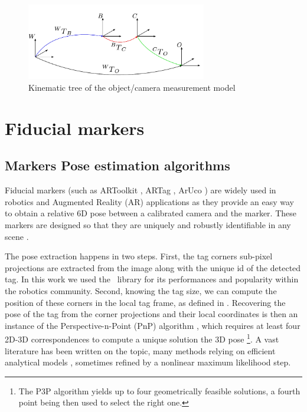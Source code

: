 \begin{figure}
    \centering
    \includegraphics[width=0.7\textwidth]{figures/kin_tree_object.pdf}
    \caption{Kinematic tree of the object/camera measurement model}
    \label{fig:camera_object_chain}
\end{figure}

%
%
\section{Fiducial markers}
\label{sec:fiducial_markers}
\subsection{Markers Pose estimation algorithms}

Fiducial markers (such as ARToolkit \cite{kato1999marker}, ARTag \cite{fiala2005artag}, ArUco \cite{garrido2014automatic}) are widely used in robotics 
and Augmented Reality (AR) applications as they provide an easy way to obtain a relative 6D pose 
between a calibrated camera and the marker. These markers are designed so that they are uniquely and robustly identifiable in any scene 
\cite{wang2016iros,romero2018speeded}. 

The pose extraction happens in two steps. First, the tag corners sub-pixel projections are extracted from the image along with the unique id of the detected tag. 
In this work we used the \apriltag\ library \cite{wang2016iros} for its performances and popularity within the robotics community. Second, knowing the tag size, 
we can compute the position of these corners in the local tag frame, as defined in . Recovering the pose of the tag from the 
corner projections and their local coordinates is then an instance 
of the Perspective-n-Point (PnP) algorithm \cite{gao2003complete}, which requires at least four 2D-3D correspondences to compute a unique solution the 3D pose 
\footnote{The P3P algorithm yields up to four geometrically feasible solutions, a fourth point being then used to select the right one.}. 
A vast literature has been written on the topic, many methods relying on efficient analytical models
\cite{gao2003complete, lepetit2009epnp, collins2014infinitesimal, terzakis2020consistently}, sometimes refined by a nonlinear maximum likelihood step.




